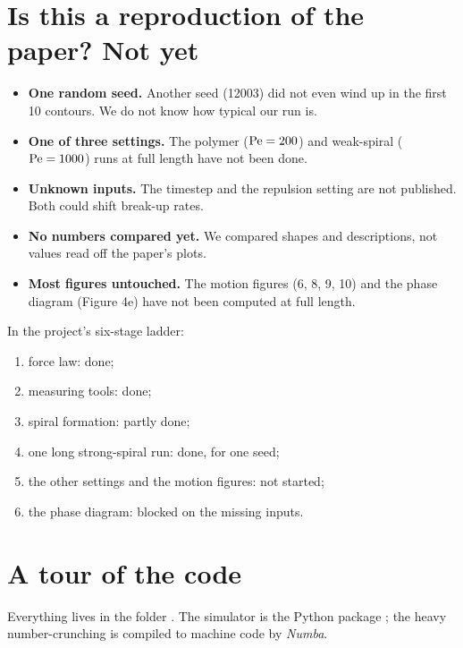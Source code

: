 \section{Is this a reproduction of the paper? Not yet}
\begin{warnbox}[title=Why ``agrees with the paper'' is not the same as ``reproduced the paper'']
\begin{itemize}
\item \textbf{One random seed.} Another seed (12003) did not even wind up in the first 10 contours. We do not know how typical our run is.
\item \textbf{One of three settings.} The polymer ($\mathrm{Pe}=200$) and weak-spiral ($\mathrm{Pe}=1000$) runs at full length have not been done.
\item \textbf{Unknown inputs.} The timestep and the repulsion setting are not published. Both could shift break-up rates.
\item \textbf{No numbers compared yet.} We compared shapes and descriptions, not values read off the paper's plots.
\item \textbf{Most figures untouched.} The motion figures (6, 8, 9, 10) and the phase diagram (Figure 4e) have not been computed at full length.
\end{itemize}
\end{warnbox}
In the project's six-stage ladder:
\begin{enumerate}
\item force law: done;
\item measuring tools: done;
\item spiral formation: partly done;
\item one long strong-spiral run: done, for one seed;
\item the other settings and the motion figures: not started;
\item the phase diagram: blocked on the missing inputs.
\end{enumerate}

\section{A tour of the code}
Everything lives in the folder . The simulator is the Python package ; the heavy number-crunching is compiled to machine code by \emph{Numba}.

